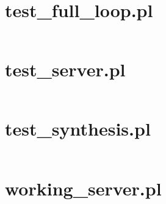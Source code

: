 \documentclass{article}
\begin{document}
\section{test\_full\_loop.pl}
\inputminted{prolog}{test_full_loop.pl}

\section{test\_server.pl}
\inputminted{prolog}{test_server.pl}

\section{test\_synthesis.pl}
\inputminted{prolog}{test_synthesis.pl}

\section{working\_server.pl}
\inputminted{prolog}{working_server.pl}
\end{document}
